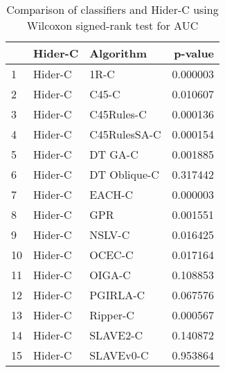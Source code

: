 \begin{table}
\footnotesize
\caption{Comparison of classifiers and Hider-C using Wilcoxon signed-rank test for AUC}
\label{tab:Hider-C wilcoxon AUC comparison}
\begin{tabular}{lllr}
\hline
 & Hider-C & Algorithm & p-value \\
\hline
1 & Hider-C & 1R-C & 0.000003 \\
2 & Hider-C & C45-C & 0.010607 \\
3 & Hider-C & C45Rules-C & 0.000136 \\
4 & Hider-C & C45RulesSA-C & 0.000154 \\
5 & Hider-C & DT GA-C & 0.001885 \\
6 & Hider-C & DT Oblique-C & 0.317442 \\
7 & Hider-C & EACH-C & 0.000003 \\
8 & Hider-C & GPR & 0.001551 \\
9 & Hider-C & NSLV-C & 0.016425 \\
10 & Hider-C & OCEC-C & 0.017164 \\
11 & Hider-C & OIGA-C & 0.108853 \\
12 & Hider-C & PGIRLA-C & 0.067576 \\
13 & Hider-C & Ripper-C & 0.000567 \\
14 & Hider-C & SLAVE2-C & 0.140872 \\
15 & Hider-C & SLAVEv0-C & 0.953864 \\
\hline
\end{tabular}
\end{table}
